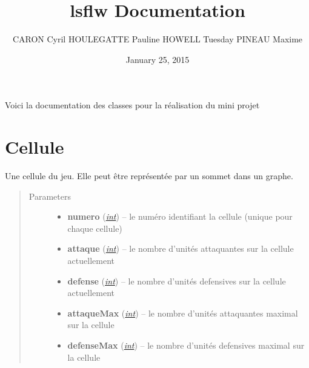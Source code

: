 \documentclass[letterpaper,10pt,english]{sphinxmanual}
\title{lsflw Documentation}
\date{January 25, 2015}
\author{CARON Cyril HOULEGATTE Pauline HOWELL Tuesday PINEAU Maxime}
\begin{document}
\maketitle
\tableofcontents
{}\label{index::doc}


Voici la documentation des classes pour la réalisation du mini projet


\chapter{Cellule}
\label{index:module-Cellule}\label{index:bienvenue-sur-cette-documentation}\label{index:cellule}

\begin{fulllineitems}
\label{index:Cellule.Cellule}
Une cellule du jeu. Elle peut être représentée par un sommet dans un graphe.
\begin{quote}\begin{description}
\item[{Parameters}] \leavevmode\begin{itemize}
\item {} 
\textbf{numero} (\href{http://docs.python.org/library/functions.html\#int}{\emph{int}}) -- le numéro identifiant la cellule (unique pour chaque cellule)

\item {} 
\textbf{attaque} (\href{http://docs.python.org/library/functions.html\#int}{\emph{int}}) -- le nombre d'unités attaquantes sur la cellule actuellement

\item {} 
\textbf{defense} (\href{http://docs.python.org/library/functions.html\#int}{\emph{int}}) -- le nombre d'unités defensives sur la cellule actuellement

\item {} 
\textbf{attaqueMax} (\href{http://docs.python.org/library/functions.html\#int}{\emph{int}}) -- le nombre d'unités attaquantes maximal sur la cellule

\item {} 
\textbf{defenseMax} (\href{http://docs.python.org/library/functions.html\#int}{\emph{int}}) -- le nombre d'unités defensives maximal sur la cellule


\end{itemize}
\end{description}
\end{quote}
\end{fulllineitems}
\end{document}
